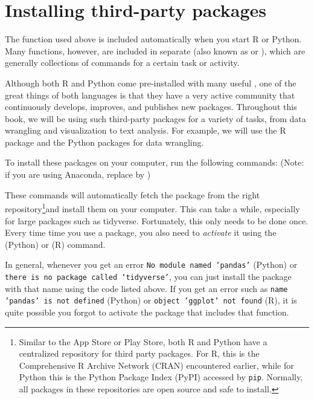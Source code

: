 \section{Installing third-party packages}

The  function used above is included automatically when you start R or Python.
Many functions, however, are included in separate  (also known as  or ), which are
generally collections of commands for a certain task or activity.

Although both R and Python come pre-installed with many useful ,
one of the great things of both languages is that they have a very active community that continuously develops, improves, and publishes new packages.
Throughout this book, we will be using such third-party packages for a variety of tasks, from data wrangling and visualization to text analysis.
For example, we will use the R package  and the Python packages  for data wrangling.

To install these packages on your computer, run the following commands:
(Note: if you are using Anaconda, replace  by )  

\begin{tcbraster}[raster columns=2,raster equal height=rows,raster valign=top]
\end{tcbraster}

\newcommand{\fnrepo}{\footnote{Similar to the App Store or Play Store, both R and Python have a centralized repository for third party packages.  For R, this is the Comprehensive R Archive Network (CRAN) encountered earlier,
    while for Python this is the Python Package Index (PyPI) accessed by \verb|pip|.  Normally, all packages in these repositories are open source and safe to install.}}

These commands will automatically fetch the package from the right repository\fnrepo and install them on your computer. This can take a while, especially for large packages such as tidyverse.
Fortunately, this only needs to be done once.
Every time time you use a package, you also need to \emph{activate} it using the  (Python) or   (R) command.

In general, whenever you get an error \texttt{No module named 'pandas'} (Python) or \texttt{there is no package called ‘tidyverse’},
you can just install the package with that name using the code listed above.
If you get an error such as \texttt{name 'pandas' is not defined} (Python) or \texttt{object 'ggplot' not found} (R),
it is quite possible you forgot to activate the package that includes that function. 


